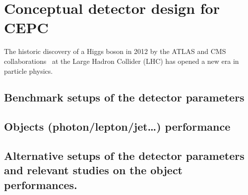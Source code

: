 
%


\section{Conceptual detector design for CEPC}
\label{sec:detector}

The historic discovery of a Higgs boson in 2012 by the ATLAS and CMS collaborations~\cite{atlas:2012obs,cms:2012obs}  at the Large Hadron Collider (LHC)  has opened a new era in particle physics. 

\subsection{Benchmark setups of the detector parameters}
\subsection{Objects (photon/lepton/jet…) performance}
\subsection{Alternative setups of the detector parameters and relevant studies on the object performances.}
